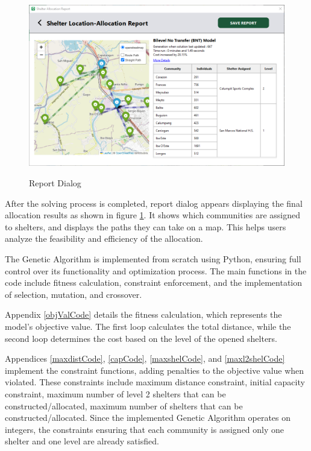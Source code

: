 \documentclass[12pt,a4paper,]{article}
\begin{document}
	\begin{figure}[h!]
		\caption{Report Dialog}
		\centering
		\includegraphics[width=\columnwidth]{Chapter 4/alloc report}
		\label{shelAllocRep}
	\end{figure}
	After the solving process is completed, report dialog appears displaying the final allocation results as shown in figure \ref{shelAllocRep}. It shows which communities are assigned to shelters, and displays the paths they can take on a map. This helps users analyze the feasibility and efficiency of the allocation.
	
	The Genetic Algorithm is implemented from scratch using Python, ensuring full control over its functionality and optimization process. The main functions in the code include fitness calculation, constraint enforcement, and the implementation of selection, mutation, and crossover.
	
	Appendix \ref{objValCode} details the fitness calculation, which represents the model's objective value. The first loop calculates the total distance, while the second loop determines the cost based on the level of the opened shelters.
	
	Appendices \ref{maxdistCode}, \ref{capCode}, \ref{maxshelCode}, and \ref{maxl2shelCode} implement the constraint functions, adding penalties to the objective value when violated. These constraints include maximum distance constraint, initial capacity constraint, maximum number of level 2 shelters that can be constructed/allocated, maximum number of shelters that can be constructed/allocated. Since the implemented Genetic Algorithm operates on integers, the constraints ensuring that each community is assigned only one shelter and one level are already satisfied.
	
\end{document}
